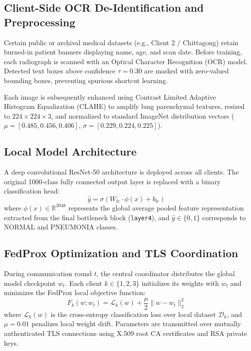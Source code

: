\documentclass[journal]{IEEEtran}
\begin{document}
\subsection{Client-Side OCR De-Identification and Preprocessing}
Certain public or archival medical datasets (e.g., Client 2 / Chittagong) retain burned-in patient banners displaying name, age, and scan date. Before training, each radiograph is scanned with an Optical Character Recognition (OCR) model. Detected text boxes above confidence $\tau = 0.30$ are masked with zero-valued bounding boxes, preventing spurious shortcut learning.

Each image is subsequently enhanced using Contrast Limited Adaptive Histogram Equalization (CLAHE) to amplify lung parenchymal textures, resized to $224 \times 224 \times 3$, and normalized to standard ImageNet distribution vectors ($\mu = [0.485, 0.456, 0.406]$, $\sigma = [0.229, 0.224, 0.225]$).

\subsection{Local Model Architecture}
A deep convolutional ResNet-50 architecture \cite{he2016deep} is deployed across all clients. The original 1000-class fully connected output layer is replaced with a binary classification head:
\begin{equation}
\hat{y} = \sigma\left(W_{\text{fc}} \cdot \phi(x) + b_{\text{fc}}\right)
\end{equation}
where $\phi(x) \in \mathbb{R}^{2048}$ represents the global average pooled feature representation extracted from the final bottleneck block (\texttt{layer4}), and $\hat{y} \in \{0, 1\}$ corresponds to NORMAL and PNEUMONIA classes.

\subsection{FedProx Optimization and TLS Coordination}
During communication round $t$, the central coordinator distributes the global model checkpoint $w_t$. Each client $k \in \{1, 2, 3\}$ initializes its weights with $w_t$ and minimizes the FedProx local objective function:
\begin{equation}
F_k(w; w_t) = \mathcal{L}_k(w) + \frac{\mu}{2} \|w - w_t\|_2^2
\label{eq:fedprox}
\end{equation}
where $\mathcal{L}_k(w)$ is the cross-entropy classification loss over local dataset $\mathcal{D}_k$, and $\mu = 0.01$ penalizes local weight drift. Parameters are transmitted over mutually authenticated TLS connections using X.509 root CA certificates and RSA private keys.
\end{document}
